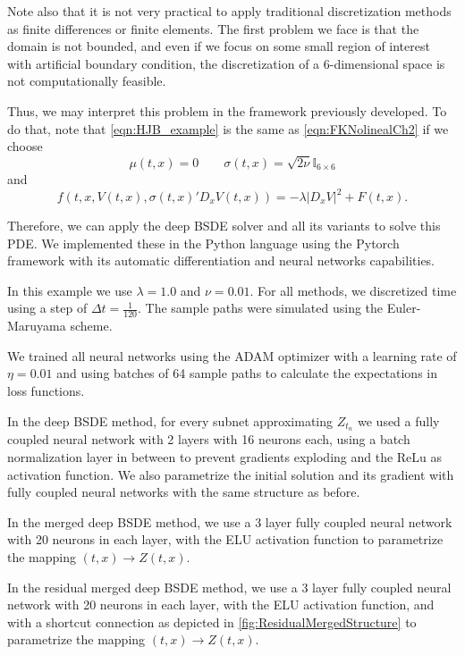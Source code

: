 Note also that it is not very practical to apply traditional discretization methods as finite differences or finite elements. The first problem we face is that the domain is not bounded, and even if we focus on some small region of interest with artificial boundary condition, the discretization of a 6-dimensional space is not computationally feasible.

Thus, we may interpret this problem in the framework previously developed. To do that, note that \eqref{eqn:HJB_example} is the same as \eqref{eqn:FKNolinealCh2} if we choose
\begin{equation}
	\mu(t,x)=0\quad \quad \sigma(t,x)=\sqrt{2\nu} \mathbb{I}_{6\times 6}
\end{equation}
and 
\begin{equation}
	f(t,x,V(t,x),\sigma(t,x)'D_x V(t,x))=-\lambda |D_x V|^2+F(t,x).
\end{equation}

Therefore, we can apply the deep BSDE solver and all its variants to solve this PDE. We implemented these in the Python language using the Pytorch framework with its automatic differentiation and neural networks capabilities.

In this example we use $\lambda=1.0$ and $\nu=0.01$. 
For all methods, we discretized time using a step of $\Delta t=\frac{1}{120}$. The sample paths were simulated using the Euler-Maruyama scheme.



We trained all neural networks using the ADAM optimizer with a learning rate of $\eta=0.01$ and using batches of 64 sample paths to calculate the expectations in loss functions. 

In the deep BSDE method, for every subnet approximating $Z_{t_n}$  we used a fully coupled neural network with 2 layers with 16 neurons each, using a batch normalization layer in between to prevent gradients exploding and the ReLu as activation function. We also parametrize the initial solution and its gradient with fully coupled neural networks with the same structure as before.


In the merged deep BSDE method, we use a 3 layer fully coupled neural network with 20 neurons in each layer, with the ELU activation function to parametrize the mapping $(t,x)\to Z(t,x)$. 


In the residual merged deep BSDE method, we use a 3 layer fully coupled neural network with 20 neurons in each layer, with the ELU activation function, and with a shortcut connection as depicted in \autoref{fig:ResidualMergedStructure} to parametrize the mapping $(t,x)\to Z(t,x)$. 

